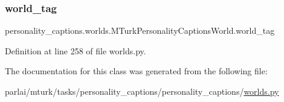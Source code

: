 \subsubsection{\texorpdfstring{world\+\_\+tag}{world\_tag}}
{\footnotesize\ttfamily personality\+\_\+captions.\+worlds.\+M\+Turk\+Personality\+Captions\+World.\+world\+\_\+tag}



Definition at line 258 of file worlds.\+py.



The documentation for this class was generated from the following file\+:\begin{DoxyCompactItemize}
\item 
parlai/mturk/tasks/personality\+\_\+captions/personality\+\_\+captions/\hyperlink{parlai_2mturk_2tasks_2personality__captions_2personality__captions_2worlds_8py}{worlds.\+py}\end{DoxyCompactItemize}
